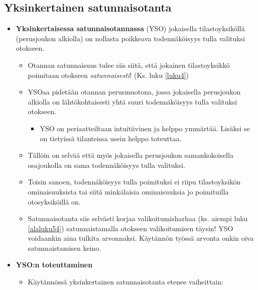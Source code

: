 \documentclass[
]{book}
\providecommand{\tightlist}{%
  \setlength{\itemsep}{0pt}\setlength{\parskip}{0pt}}
\begin{document}
\hypertarget{yksinkertainen-satunnaisotanta}{%
\subsection{Yksinkertainen satunnaisotanta}\label{yksinkertainen-satunnaisotanta}}

\begin{itemize}
\tightlist
\item
  \textbf{Yksinkertaisessa satunnaisotannassa} (YSO) jokaisella tilastoyksiköllä (perusjoukon alkiolla) on nollasta poikkeava todennäköisyys tulla valituksi otokseen.

  \begin{itemize}
  \tightlist
  \item
    Otannan satunnaisuus tulee siis siitä, että jokainen tilastoyksikkö poimitaan otokseen \emph{satunnaisesti}! (Ks. luku \ref{luku4})
  \item
    YSOaa pidetään otannan perusmuotona, jossa jokaisella perusjoukon alkiolla on lähtökohtaisesti yhtä suuri todennäköisyys tulla valituksi otokseen.

    \begin{itemize}
    \tightlist
    \item
      YSO on periaatteiltaan intuitiivinen ja helppo ymmärtää. Lisäksi se on tietyissä tilanteissa usein helppo toteuttaa.
    \end{itemize}
  \item
    Tällöin on selvää että myös jokaisella perusjoukon samankokoisella osajoukolla on sama todennäköisyys tulla valituksi.
  \item
    Toisin sanoen, todennäköisyys tulla poimituksi ei riipu tilastoyksikön ominaisuuksista tai siitä minkälaisia ominaisuuksia jo poimituilla otosyksiköillä on.
  \item
    Satunnaisotanta siis selvästi korjaa valikoitumisharhaa (ks. aiempi luku \ref{alaluku54}) satunnaistamalla otokseen valikoitumisen täysin! YSO voidaankin aina tulkita arvonnaksi. Käytännön työssä arvonta onkin oiva satunnaistamisen keino.
  \end{itemize}
\item
  \textbf{YSO:n toteuttaminen}

  \begin{itemize}
  \tightlist
  \item
    Käytännössä yksinkertainen satunnaisotanta etenee vaiheittain:


\end{itemize}
\end{itemize}
\end{document}
